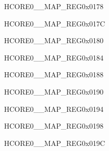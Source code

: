 \begin{register}{H}{CORE0\_\_MAP\_REG}{0x0178}\label{regdesc:CORE0USBOTGENDPMULTIPROCINTMAPREG}
\end{register}\vspace{-3em}


\begin{register}{H}{CORE0\_\_MAP\_REG}{0x017C}\label{regdesc:CORE0JPEGINTMAPREG}
\end{register}\vspace{-3em}


\begin{register}{H}{CORE0\_\_MAP\_REG}{0x0180}\label{regdesc:CORE0PPAINTMAPREG}
\end{register}\vspace{-3em}


\begin{register}{H}{CORE0\_\_MAP\_REG}{0x0184}\label{regdesc:CORE0CORE0TRACEINTMAPREG}
\end{register}\vspace{-3em}


\begin{register}{H}{CORE0\_\_MAP\_REG}{0x0188}\label{regdesc:CORE0CORE1TRACEINTMAPREG}
\end{register}\vspace{-3em}



\begin{register}{H}{CORE0\_\_MAP\_REG}{0x0190}\label{regdesc:CORE0ISPINTMAPREG}
\end{register}\vspace{-3em}


\begin{register}{H}{CORE0\_\_MAP\_REG}{0x0194}\label{regdesc:CORE0I3CMSTINTMAPREG}
\end{register}\vspace{-3em}


\begin{register}{H}{CORE0\_\_MAP\_REG}{0x0198}\label{regdesc:CORE0I3CSLVINTMAPREG}
\end{register}\vspace{-3em}


\begin{register}{H}{CORE0\_\_MAP\_REG}{0x019C}\label{regdesc:CORE0USBOTG11INTMAPREG}
\end{register}\vspace{-3em}


